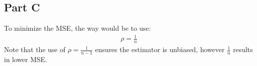 \documentclass{article}
\begin{document}

\subsection*{Part C}
To minimize the MSE, the way would be to use:
\begin{align*}
\boxed{ \rho = \frac{1}{n} }
\end{align*}
Note that the use of $\rho=\frac{1}{n-1}$ ensures the estimator is unbiased, however $\frac{1}{n}$ results in lower MSE.
\end{document}
